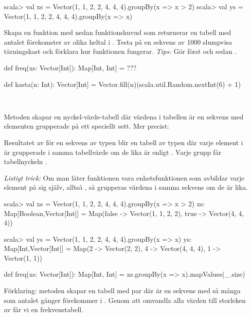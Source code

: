 \begin{REPL}
scala> val xs = Vector(1, 1, 2, 2, 4, 4, 4).groupBy(x => x > 2)
scala> val ys = Vector(1, 1, 2, 2, 4, 4, 4).groupBy(x => x)
\end{REPL}

\Subtask Skapa en funktion  med nedan funktionshuvud som returnerar en tabell med antalet förekomster av olika heltal i . Testa  på en sekvens av 1000 slumpvisa tärningskast och förklara hur funktionen  fungerar. \emph{Tips:} Gör först  och sedan .

\begin{Code}
def freq(xs: Vector[Int]): Map[Int, Int] = ???

def kasta(n: Int): Vector[Int] =
  Vector.fill(n)(scala.util.Random.nextInt(6) + 1)
\end{Code}

\SOLUTION

\TaskSolved \what~

\SubtaskSolved Metoden  skapar en nyckel-värde-tabell där värdena i tabellen är en sekvens med elementen grupperade på ett speciellt sett.
Mer precist:

Resultatet av  för en sekvens  av typen  blir en tabell av typen  där varje element  i  är grupperade i samma tabellvärde om de lika är enligt . Varje grupp får tabellnyckeln .

\emph{Listigt trick:} Om man låter funktionen  vara enhetsfunktionen som avbildar varje element på sig själv, alltså , så grupperas värdena i samma sekvens om de är lika.

\begin{REPL}
scala> val xs = Vector(1, 1, 2, 2, 4, 4, 4).groupBy(x => x > 2)
xs: Map[Boolean,Vector[Int]] =
  Map(false -> Vector(1, 1, 2, 2), true -> Vector(4, 4, 4))

scala> val ys = Vector(1, 1, 2, 2, 4, 4, 4).groupBy(x => x)
ys: Map[Int,Vector[Int]] =
  Map(2 -> Vector(2, 2), 4 -> Vector(4, 4, 4), 1 -> Vector(1, 1))
\end{REPL}


\SubtaskSolved

\begin{Code}
def freq(xs: Vector[Int]): Map[Int, Int] =
  xs.groupBy(x => x).mapValues(_.size)
\end{Code}
Förklaring: metoden  skapar en tabell med par  där  är en sekvens med så många  som antalet gånger  förekommer i . Genom att omvandla alla värden  till storleken av  får vi en frekvenstabell.

